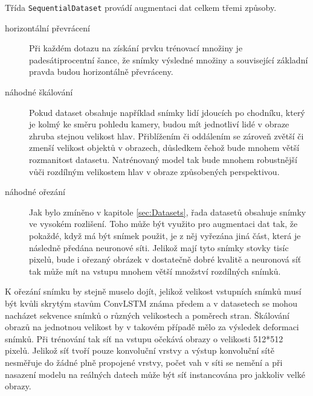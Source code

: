 Třída \texttt{SequentialDataset} provádí augmentaci dat celkem třemi způsoby.
\begin{description}
\item[horizontální převrácení] Při každém dotazu na získání prvku trénovací množiny je padesátiprocentní šance, že snímky výsledné množiny a související základní pravda budou horizontálně převráceny.

\item[náhodné škálování]
Pokud dataset obsahuje například snímky lidí jdoucích po chodníku, který je kolmý ke směru pohledu kamery, budou mít jednotliví lidé v obraze zhruba stejnou velikost hlav.
Přiblížením či oddálením se zároveň zvětší či zmenší velikost objektů v obrazech, důsledkem čehož bude mnohem větší rozmanitost datasetu.
Natrénovaný model tak bude mnohem robustnější vůči rozdílným velikostem hlav v obraze způsobených perspektivou.

\item[náhodné ořezání]
Jak bylo zmíněno v kapitole \ref{sec:Datasets}, řada datasetů obsahuje snímky ve vysokém rozlišení.
Toho může být využito pro augmentaci dat tak, že pokaždé, když má být snímek použit, je z něj vyřezána jiná část, která je následně předána neuronové síti.
Jelikož mají tyto snímky stovky tisíc pixelů, bude i ořezaný obrázek v dostatečně dobré kvalitě a neuronová síť tak může mít na vstupu mnohem větší množství rozdílných snímků.


\end{description}

K ořezání snímku by stejně muselo dojít, jelikož velikost vstupních snímků musí být kvůli skrytým stavům ConvLSTM známa předem a v datasetech se mohou nacházet sekvence snímků o různých velikostech a poměrech stran. Škálování obrazů na jednotnou velikost by v takovém případě mělo za výsledek deformaci snímků.
Při trénování tak síť na vstupu očekává obrazy o velikosti 512*512 pixelů.
Jelikož síť tvoří pouze konvoluční vrstvy a výstup konvoluční sítě nesměřuje do žádné plně propojené vrstvy, počet vah v síti se nemění a při nasazení modelu na reálných datech může být síť instancována pro jakkoliv velké obrazy.

